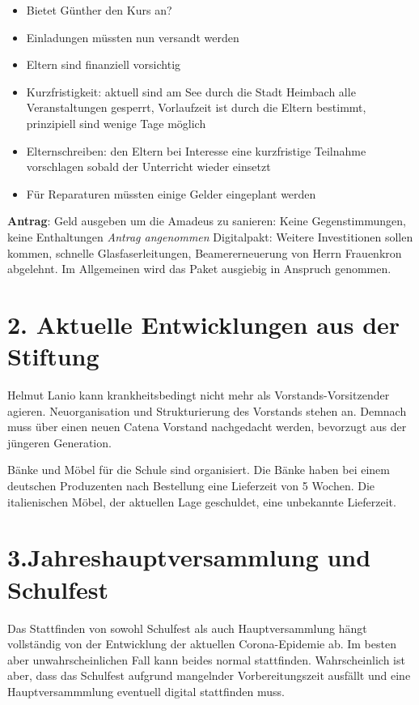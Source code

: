 \documentclass[a4paper, 11pt]{article}
\begin{document}
\begin{itemize}
\item Bietet Günther den Kurs an?
\item Einladungen müssten nun versandt werden
\item Eltern sind finanziell vorsichtig
\item Kurzfristigkeit: aktuell sind am See durch die Stadt Heimbach alle Veranstaltungen gesperrt, Vorlaufzeit ist durch die Eltern bestimmt, prinzipiell sind wenige Tage möglich
\item Elternschreiben: den Eltern bei Interesse eine kurzfristige Teilnahme vorschlagen sobald der Unterricht wieder einsetzt
\item Für Reparaturen müssten einige Gelder eingeplant werden
\end{itemize}
\textbf{Antrag}: Geld ausgeben um die Amadeus zu sanieren: Keine Gegenstimmungen, keine Enthaltungen
\emph{Antrag angenommen}
Digitalpakt: Weitere Investitionen sollen kommen, schnelle Glasfaserleitungen, Beamererneuerung von Herrn Frauenkron abgelehnt.
Im Allgemeinen wird das Paket ausgiebig in Anspruch genommen.

\section*{2. Aktuelle Entwicklungen aus der Stiftung}

Helmut Lanio kann krankheitsbedingt nicht mehr als Vorstands-Vorsitzender agieren.
Neuorganisation und Strukturierung des Vorstands stehen an.
Demnach muss über einen neuen Catena Vorstand nachgedacht werden, bevorzugt aus der jüngeren Generation.

Bänke und Möbel für die Schule sind organisiert. Die Bänke haben bei einem deutschen Produzenten nach Bestellung eine Lieferzeit von 5 Wochen. Die italienischen Möbel, der aktuellen Lage geschuldet, eine unbekannte Lieferzeit.

\section*{3.Jahreshauptversammlung und Schulfest}

Das Stattfinden von sowohl Schulfest als auch Hauptversammlung hängt vollständig von der Entwicklung der aktuellen Corona-Epidemie ab.
Im besten aber unwahrscheinlichen Fall kann beides normal stattfinden. Wahrscheinlich ist aber, dass das Schulfest aufgrund mangelnder Vorbereitungszeit ausfällt und eine Hauptversammmlung eventuell digital stattfinden muss.
\end{document}
